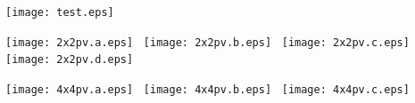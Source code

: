 \documentclass[12pt]{article}
\begin{document}
\texttt{[image: test.eps]}\hfill~

\texttt{[image: 2x2pv.a.eps]}\hfill~
\texttt{[image: 2x2pv.b.eps]}\hfill~
\texttt{[image: 2x2pv.c.eps]}\hfill~
\texttt{[image: 2x2pv.d.eps]}\hfill~

\texttt{[image: 4x4pv.a.eps]}\hfill~
\texttt{[image: 4x4pv.b.eps]}\hfill~
\texttt{[image: 4x4pv.c.eps]}\hfill~
\end{document}
